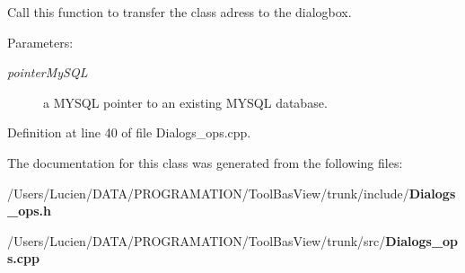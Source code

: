 Call this function to transfer the class adress to the dialogbox. 

\begin{Desc}
\item[Parameters:]
\begin{description}
\item[{\em pointer\-My\-SQL}]a MYSQL pointer to an existing MYSQL database. \end{description}
\end{Desc}


Definition at line 40 of file Dialogs\_\-ops.cpp.

The documentation for this class was generated from the following files:\begin{CompactItemize}
\item 
/Users/Lucien/DATA/PROGRAMATION/Tool\-Bas\-View/trunk/include/{\bf Dialogs\_\-ops.h}\item 
/Users/Lucien/DATA/PROGRAMATION/Tool\-Bas\-View/trunk/src/{\bf Dialogs\_\-ops.cpp}\end{CompactItemize}
